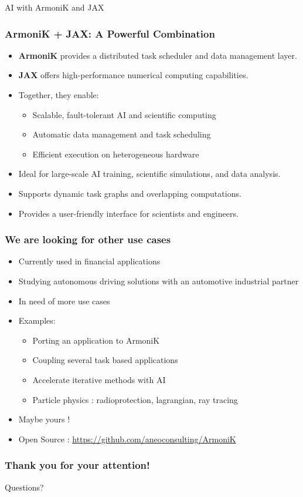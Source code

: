 \documentclass[10pt,aspectratio=1609]{beamer}
\begin{document}
\begin{section}{AI with ArmoniK and JAX}
 \begin{frame}
   \frametitle{ArmoniK + JAX: A Powerful Combination}
   \begin{itemize}
     \item \textbf{ArmoniK} provides a distributed task scheduler and data management layer.
     \item \textbf{JAX} offers high-performance numerical computing capabilities.
     \item Together, they enable:
           \begin{itemize}
             \item Scalable, fault-tolerant AI and scientific computing
             \item Automatic data management and task scheduling
             \item Efficient execution on heterogeneous hardware
           \end{itemize}
     \item Ideal for large-scale AI training, scientific simulations, and data analysis.
     \item Supports dynamic task graphs and overlapping computations.
     \item Provides a user-friendly interface for scientists and engineers.
   \end{itemize}
 \end{frame}

 \begin{frame}
   \frametitle{We are looking for other use cases}
   \begin{itemize}
     \item Currently used in financial applications
     \item Studying autonomous driving solutions with an automotive industrial partner
     \item In need of more use cases
     \item Examples:
           \begin{itemize}
             \item Porting an application to ArmoniK
             \item Coupling several task based applications
             \item Accelerate iterative methods with AI
             \item Particle physics : radioprotection, lagrangian, ray tracing
           \end{itemize}
     \item Maybe yours !
     \item Open Source : \url{https://github.com/aneoconsulting/ArmoniK}
   \end{itemize}
 \end{frame}

 \begin{frame}
   \frametitle{Thank you for your attention!}
   Questions?
 \end{frame}
\end{section}
\end{document}
